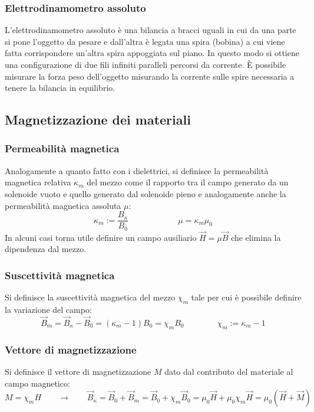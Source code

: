 \documentclass[a4paper]{article}
\begin{document}
\subsubsection*{Elettrodinamometro assoluto}
L'elettrodinamometro assoluto è una bilancia a bracci uguali in cui da una parte si pone l'oggetto da pesare e dall'altra è
legata una spira (bobina) a cui viene fatta corrispondere un'altra spira appoggiata sul piano. In questo modo si ottiene una
configurazione di due fili infiniti paralleli percorsi da corrente. È possibile misurare la forza peso dell'oggetto misurando
la corrente sulle spire necessaria a tenere la bilancia in equilibrio.

\subsection{Magnetizzazione dei materiali}
\subsubsection*{Permeabilità magnetica}
Analogamente a quanto fatto con i dielettrici, si definisce la permeabilità magnetica relativa \(\kappa_m\) del mezzo come il
rapporto tra il campo generato da un solenoide vuoto e quello generato dal solenoide pieno e analogamente anche la permeabilità
magnetica assoluta \(\mu\): \[\kappa_m := \frac{B_\kappa}{B_0} \qquad\qquad\qquad \mu = \kappa_m \mu_0\]
In alcuni casi torna utile definire un campo ausiliario \(\vec{H} = \mu \vec{B}\) che elimina la dipendenza dal mezzo.

\subsubsection*{Suscettività magnetica}
Si definisce la suscettività magnetica del mezzo \(\chi_m\) tale per cui è possibile definire la variazione del campo:
\[\vec{B}_m = \vec{B}_\kappa - \vec{B}_0 = (\kappa_m - 1) B_0 = \chi_m B_0 \qquad\qquad \chi_m := \kappa_m - 1\]

\subsubsection*{Vettore di magnetizzazione}
Si definisce il vettore di magnetizzazione \(M\) dato dal contributo del materiale al campo magnetico:
\[M = \chi_m H \qquad \rightarrow \qquad \vec{B}_\kappa = \vec{B}_0 + \vec{B}_m = \vec{B}_0 + \chi_m \vec{B}_0 = \mu_0 \vec{H} + \mu_0 \chi_m \vec{H} = \mu_0(\vec{H} + \vec{M})\]
\end{document}
